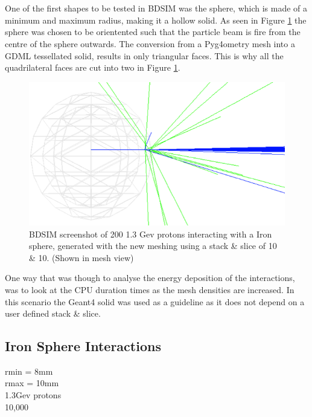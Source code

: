 \documentclass[12pt,a4paper]{article}
\begin{document}
\\\\
One of the first shapes to be tested in BDSIM was the sphere, which is made of a minimum and maximum radius, making it a hollow solid. As seen in Figure \ref{sphbd} the sphere was chosen to be orientented such that the particle beam is fire from the centre of the sphere outwards. The conversion from a Pyg4ometry mesh into a GDML tessellated solid, results in only triangular faces. This is why all the quadrilateral faces are cut into two in Figure \ref{sphbd}.

\begin{figure}[h!]
\centering
\includegraphics[scale=1]{Images//BDSIM//ProtonSphere.png}
\caption[width=\columnwidth]{BDSIM screenshot of 200 1.3 Gev protons interacting with a Iron sphere, generated with the new meshing using a stack \& slice of 10 \& 10. (Shown in mesh view)}
\label{sphbd}
\end{figure}

\noindent One way that was though to analyse the energy deposition of the interactions, was to look at the CPU duration times as the mesh densities are increased. In this scenario the Geant4 solid was used as a guideline as it does not depend on a user defined stack \& slice. 

\subsection{Iron Sphere Interactions}
rmin = 8mm\\
rmax = 10mm\\
1.3Gev protons\\
10,000\\
\end{document}
